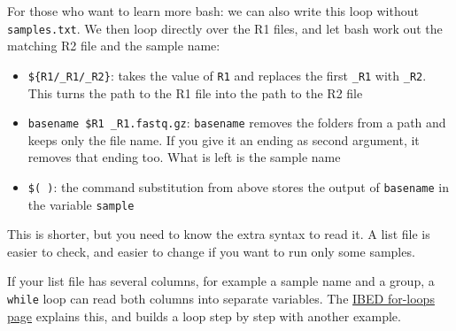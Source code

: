 \documentclass[
  letterpaper,
  DIV=11,
  numbers=noendperiod]{scrreprt}
\newenvironment{Shaded}{}{}
\newcommand{\BuiltInTok}[1]{\textcolor[rgb]{0.84,0.23,0.29}{#1}}
\newcommand{\ControlFlowTok}[1]{\textcolor[rgb]{0.84,0.23,0.29}{#1}}
\newcommand{\FunctionTok}[1]{\textcolor[rgb]{0.44,0.26,0.76}{#1}}
\newcommand{\KeywordTok}[1]{\textcolor[rgb]{0.84,0.23,0.29}{#1}}
\newcommand{\NormalTok}[1]{\textcolor[rgb]{0.14,0.16,0.18}{#1}}
\newcommand{\OperatorTok}[1]{\textcolor[rgb]{0.14,0.16,0.18}{#1}}
\newcommand{\PreprocessorTok}[1]{\textcolor[rgb]{0.84,0.23,0.29}{#1}}
\newcommand{\SpecialStringTok}[1]{\textcolor[rgb]{0.01,0.18,0.38}{#1}}
\newcommand{\StringTok}[1]{\textcolor[rgb]{0.01,0.18,0.38}{#1}}
\newcommand{\VariableTok}[1]{\textcolor[rgb]{0.89,0.38,0.04}{#1}}
\providecommand{\tightlist}{%
  \setlength{\itemsep}{0pt}\setlength{\parskip}{0pt}}
\begin{document}
\begin{tcolorbox}[enhanced jigsaw, colbacktitle=quarto-callout-tip-color!10!white, rightrule=.15mm, leftrule=.75mm, colback=white, opacitybacktitle=0.6, title=\textcolor{quarto-callout-tip-color}{\faLightbulb}\hspace{0.5em}{Tip: Finding R2 without a list file (optional)}, bottomrule=.15mm, left=2mm, colframe=quarto-callout-tip-color-frame, opacityback=0, breakable, bottomtitle=1mm, coltitle=black, arc=.35mm, toprule=.15mm, toptitle=1mm, titlerule=0mm]

For those who want to learn more bash: we can also write this loop
without \texttt{samples.txt}. We then loop directly over the R1 files,
and let bash work out the matching R2 file and the sample name:

\begin{Shaded}
\end{Shaded}

\begin{itemize}
\tightlist
\item
  \texttt{\$\{R1/\_R1/\_R2\}}: takes the value of \texttt{R1} and
  replaces the first \texttt{\_R1} with \texttt{\_R2}. This turns the
  path to the R1 file into the path to the R2 file
\item
  \texttt{basename\ \$R1\ \_R1.fastq.gz}: \texttt{basename} removes the
  folders from a path and keeps only the file name. If you give it an
  ending as second argument, it removes that ending too. What is left is
  the sample name
\item
  \texttt{\$(\ )}: the command substitution from above stores the output
  of \texttt{basename} in the variable \texttt{sample}
\end{itemize}

This is shorter, but you need to know the extra syntax to read it. A
list file is easier to check, and easier to change if you want to run
only some samples.

If your list file has several columns, for example a sample name and a
group, a \texttt{while} loop can read both columns into separate
variables. The
\href{https://scienceparkstudygroup.github.io/ibed-bioinformatics-page/source/core_tools/bash-for-loops.html}{IBED
for-loops page} explains this, and builds a loop step by step with
another example.

\end{tcolorbox}
\end{document}

